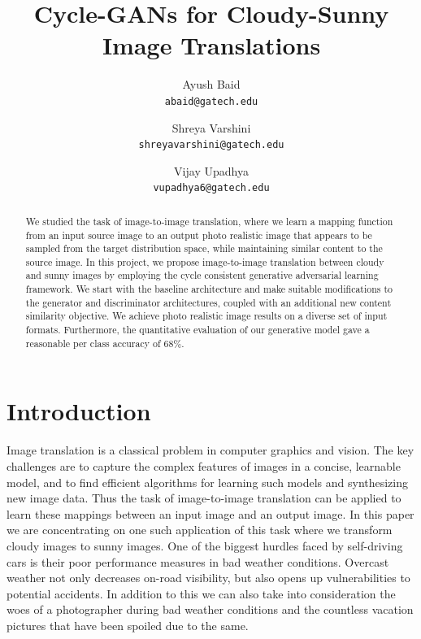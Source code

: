 \documentclass[10pt,twocolumn,letterpaper]{article}
\begin{document}
\title{Cycle-GANs for Cloudy-Sunny Image Translations}
\author{Ayush Baid\\
{\tt\small abaid@gatech.edu}
\and
Shreya Varshini\\
{\tt\small shreyavarshini@gatech.edu}
\and
Vijay Upadhya\\
{\tt\small vupadhya6@gatech.edu}
}

\maketitle

\begin{abstract}
We studied the task of image-to-image translation, where we learn a mapping function from an input source image to an output photo realistic image that appears to be sampled from the target distribution space, while maintaining similar content to the source image. In this project, we propose image-to-image translation between cloudy and sunny images by employing the cycle consistent generative adversarial learning framework. We start with the baseline architecture and make suitable modifications to the generator and discriminator architectures, coupled with an additional new content similarity objective. We achieve photo realistic image results on a diverse set of input formats. Furthermore, the quantitative evaluation of our generative model gave a reasonable per class accuracy of 68\%.
\end{abstract}

\section{Introduction}

Image translation is a classical problem in computer graphics and vision. The key challenges are to capture the complex features of images in a concise, learnable model, and to find efficient algorithms for learning such models and synthesizing new image data. Thus the task of image-to-image translation can be applied to learn these mappings between an input image and an output image. In this paper we are concentrating on one such application of this task where we transform cloudy images to sunny images. One of the biggest hurdles faced by self-driving cars is their poor performance measures in bad weather conditions. Overcast weather not only decreases on-road visibility, but also opens up vulnerabilities to potential accidents. In addition to this we can also take into consideration the woes of a photographer during bad weather conditions and the countless vacation pictures that have been spoiled due to the same.
\end{document}
